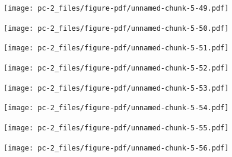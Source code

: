 \documentclass[
  letterpaper,
  DIV=11,
  numbers=noendperiod]{scrreprt}
\begin{document}
\begin{figure}[H]

{\centering \texttt{[image: pc-2\_files/figure-pdf/unnamed-chunk-5-49.pdf]}

}

\end{figure}

\begin{figure}[H]

{\centering \texttt{[image: pc-2\_files/figure-pdf/unnamed-chunk-5-50.pdf]}

}

\end{figure}

\begin{figure}[H]

{\centering \texttt{[image: pc-2\_files/figure-pdf/unnamed-chunk-5-51.pdf]}

}

\end{figure}

\begin{figure}[H]

{\centering \texttt{[image: pc-2\_files/figure-pdf/unnamed-chunk-5-52.pdf]}

}

\end{figure}

\begin{figure}[H]

{\centering \texttt{[image: pc-2\_files/figure-pdf/unnamed-chunk-5-53.pdf]}

}

\end{figure}

\begin{figure}[H]

{\centering \texttt{[image: pc-2\_files/figure-pdf/unnamed-chunk-5-54.pdf]}

}

\end{figure}

\begin{figure}[H]

{\centering \texttt{[image: pc-2\_files/figure-pdf/unnamed-chunk-5-55.pdf]}

}

\end{figure}

\begin{figure}[H]

{\centering \texttt{[image: pc-2\_files/figure-pdf/unnamed-chunk-5-56.pdf]}

}

\end{figure}
\end{document}
